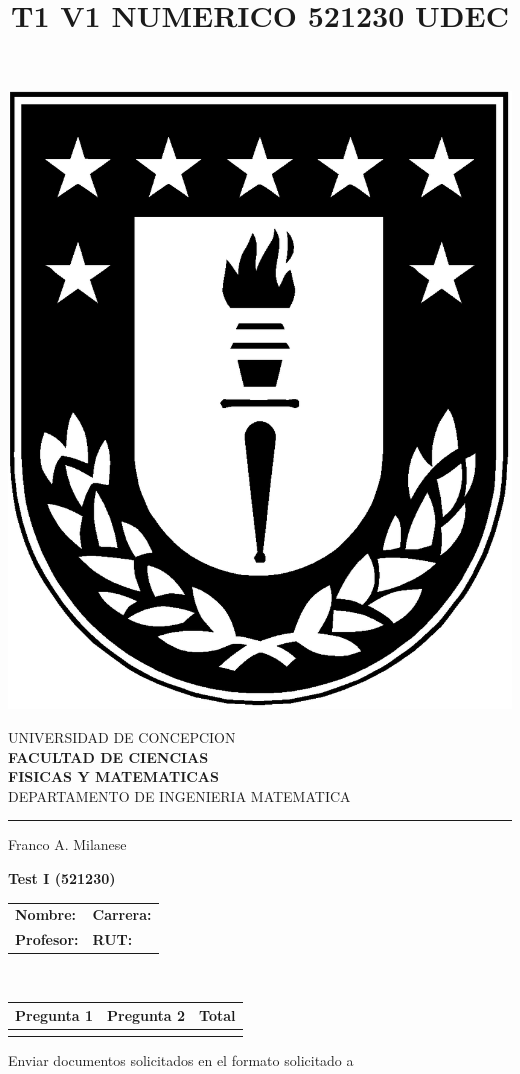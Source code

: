 \documentclass[11pt]{article}
\begin{document}
\title{T1 V1 NUMERICO 521230 UDEC}

\begin{minipage}{0.12\textwidth}
\includegraphics[width=\textwidth]{logoudec.eps}
\end{minipage}
\hspace{5mm}
\begin{minipage}{0.9\textwidth}
UNIVERSIDAD DE CONCEPCION\\
{\small\small\bf 
FACULTAD DE CIENCIAS\\ 
FISICAS Y MATEMATICAS}\\
DEPARTAMENTO DE INGENIERIA MATEMATICA\\
\rule{0.66\textwidth}{.5pt} Franco A. Milanese
\end{minipage}

\vspace{0.5cm}
\centerline{\bf Test I (521230)}
\begin{center}
 \begin{tabular}{p{}p{}}
	\textbf{Nombre:}   &\textbf{Carrera:}\\
	\textbf{Profesor:} & \textbf{ RUT:}
 \end{tabular}
 \\
 \vspace{0.2cm}
 \begin{tabular}{||p{2cm}|p{2cm}||p{2cm}||}
 \hline
 Pregunta 1 &  Pregunta 2 &     Total\\
 \hline

  \vspace{1.5cm} & &       \\
 \hline
 \end{tabular}
 \end{center}
 Enviar documentos solicitados en el formato solicitado a 
\end{document}
